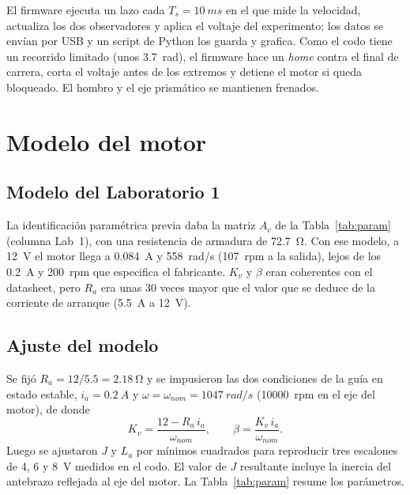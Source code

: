 \documentclass[conference,a4paper]{IEEEtran}
\begin{document}
El firmware ejecuta un lazo cada $T_s=\SI{10}{ms}$ en el que mide la velocidad, actualiza los dos observadores y aplica el voltaje del experimento; los datos se envían por USB y un script de Python los guarda y grafica. Como el codo tiene un recorrido limitado (unos \SI{3.7}{rad}), el firmware hace un \emph{home} contra el final de carrera, corta el voltaje antes de los extremos y detiene el motor si queda bloqueado. El hombro y el eje prismático se mantienen frenados.

\section{Modelo del motor}
\subsection{Modelo del Laboratorio 1}
La identificación paramétrica previa daba la matriz $A_c$ de la Tabla~\ref{tab:param} (columna Lab~1), con una resistencia de armadura de \SI{72.7}{\ohm}. Con ese modelo, a \SI{12}{V} el motor llega a \SI{0.084}{A} y \SI{558}{rad/s} (\SI{107}{rpm} a la salida), lejos de los \SI{0.2}{A} y \SI{200}{rpm} que especifica el fabricante. $K_v$ y $\beta$ eran coherentes con el datasheet, pero $R_a$ era unas 30 veces mayor que el valor que se deduce de la corriente de arranque (\SI{5.5}{A} a \SI{12}{V}).

\subsection{Ajuste del modelo}
Se fijó $R_a = 12/5.5 = \SI{2.18}{\ohm}$ y se impusieron las dos condiciones de la guía en estado estable, $i_a=\SI{0.2}{A}$ y $\omega=\omega_{nom}=\SI{1047}{rad/s}$ (\SI{10000}{rpm} en el eje del motor), de donde
\begin{equation}
K_v=\frac{12-R_a\,i_a}{\omega_{nom}},\qquad \beta = \frac{K_v\, i_a}{\omega_{nom}}.
\end{equation}
Luego se ajustaron $J$ y $L_a$ por mínimos cuadrados para reproducir tres escalones de 4, 6 y \SI{8}{V} medidos en el codo. El valor de $J$ resultante incluye la inercia del antebrazo reflejada al eje del motor. La Tabla~\ref{tab:param} resume los parámetros.
\end{document}
